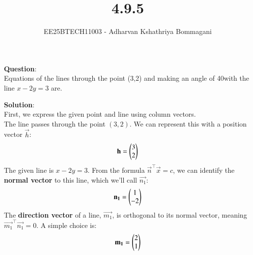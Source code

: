 \documentclass[journal]{IEEEtran}
\begin{document}

\vspace{3cm}

\title{4.9.5}
\author{EE25BTECH11003 - Adharvan Kshathriya Bommagani}
{\newpage\maketitle}

\renewcommand{\thefigure}{\theenumi}
\renewcommand{\thetable}{\theenumi}
\setlength{\intextsep}{10pt}

\textbf{Question}:\\
Equations of the lines through the point (3,2) and making an angle of 40\degree with the line $x - 2y = 3$ are.

\bigskip

\textbf{Solution}:\\



First, we express the given point and line using column vectors.\\
The line passes through the point $(3, 2)$. We can represent this with a position vector $\vec{h}$:
$$ \mathbf{h} = \begin{pmatrix}3 \\ 2\end{pmatrix} $$
The given line is $x - 2y = 3$. From the formula $\vec{n}^\top \vec{x} = c$, we can identify the \textbf{normal vector} to this line, which we'll call $\vec{n_1}$:
$$ \mathbf{n_1} = \begin{pmatrix}1 \\ -2\end{pmatrix} $$
The \textbf{direction vector} of a line, $\vec{m_1}$, is orthogonal to its normal vector, meaning $\vec{m_1}^\top \vec{n_1} = 0$. A simple choice is:
$$ \mathbf{m_1} = \begin{pmatrix}2 \\ 1\end{pmatrix} $$
\end{document}
